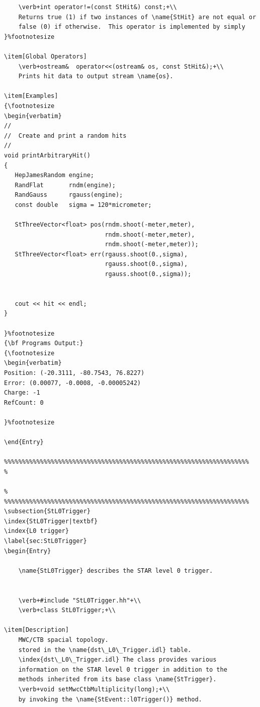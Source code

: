 \begin{enumerate}
\begin{Entry}
{\begin{verbatim}
    \verb+int operator!=(const StHit&) const;+\\
    Returns true (1) if two instances of \name{StHit} are not equal or
    false (0) if otherwise.  This operator is implemented by simply
}%footnotesize    

\item[Global Operators]
    \verb+ostream&  operator<<(ostream& os, const StHit&);+\\
    Prints hit data to output stream \name{os}.

\item[Examples]
{\footnotesize
\begin{verbatim}
//
//  Create and print a random hits
//
void printArbitraryHit()
{
   HepJamesRandom engine;
   RandFlat       rndm(engine);
   RandGauss      rgauss(engine);
   const double   sigma = 120*micrometer;

   StThreeVector<float> pos(rndm.shoot(-meter,meter),
                            rndm.shoot(-meter,meter),
                            rndm.shoot(-meter,meter));
   StThreeVector<float> err(rgauss.shoot(0.,sigma),
                            rgauss.shoot(0.,sigma),
                            rgauss.shoot(0.,sigma));
    

   cout << hit << endl;
}
  
}%footnotesize
{\bf Programs Output:}
{\footnotesize
\begin{verbatim}
Position: (-20.3111, -80.7543, 76.8227)
Error: (0.00077, -0.0008, -0.00005242)
Charge: -1
RefCount: 0
    
}%footnotesize

\end{Entry}

%%%%%%%%%%%%%%%%%%%%%%%%%%%%%%%%%%%%%%%%%%%%%%%%%%%%%%%%%%%%%%%%%%%%
%
    
%
%%%%%%%%%%%%%%%%%%%%%%%%%%%%%%%%%%%%%%%%%%%%%%%%%%%%%%%%%%%%%%%%%%%%
\subsection{StL0Trigger}
\index{StL0Trigger|textbf}
\index{L0 trigger}
\label{sec:StL0Trigger}
\begin{Entry}
    
    \name{StL0Trigger} describes the STAR level 0 trigger.

    
    \verb+#include "StL0Trigger.hh"+\\
    \verb+class StL0Trigger;+\\

\item[Description]
    MWC/CTB spacial topology.
    stored in the \name{dst\_L0\_Trigger.idl} table.
    \index{dst\_L0\_Trigger.idl} The class provides various
    information on the STAR level 0 trigger in addition to the
    methods inherited from its base class \name{StTrigger}.
    \verb+void setMwcCtbMultiplicity(long);+\\   
    by invoking the \name{StEvent::l0Trigger()} method.
    

\end{verbatim}}
\end{Entry}
\end{enumerate}
